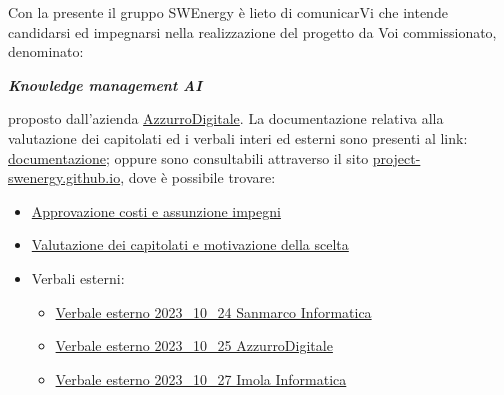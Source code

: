 Con la presente il gruppo SWEnergy è lieto di comunicarVi che intende candidarsi
ed impegnarsi nella realizzazione del progetto da Voi commissionato, denominato:

\begin{center}
\textbf{\textit{Knowledge management AI}}
\end{center}

proposto dall’azienda \href{https://www.azzurrodigitale.com/}{AzzurroDigitale}. 
La documentazione relativa alla valutazione dei capitolati ed i verbali
interi ed esterni sono presenti al link:
\href{https://github.com/Project-SWEnergy/documentazione}{documentazione};
oppure sono consultabili attraverso il sito 
\href{https://project-swenergy.github.io/}{project-swenergy.github.io},
dove è possibile trovare:

\begin{itemize}
	\item
		\href{https://github.com/Project-SWEnergy/documentazione/blob/main/Candidatura/Approvazione\%20costi\%20e\%20assunzione\%20impegni.pdf}{Approvazione costi e assunzione impegni}

	\item
		\href{https://github.com/Project-SWEnergy/documentazione/blob/main/Candidatura/Valutazione\%20capitolati.pdf}{Valutazione dei capitolati e motivazione della scelta}
	
	\item Verbali esterni:
		\begin{itemize}
			\item
				\href{https://github.com/Project-SWEnergy/documentazione/blob/main/Candidatura/Verbale\%20esterno\%20-\%202023_10_24\%20Sanmarco.pdf}{Verbale esterno 2023\_10\_24 Sanmarco Informatica}
			\item
				\href{https://github.com/Project-SWEnergy/documentazione/blob/main/Candidatura/Verbale\%20esterno\%20-\%202023_10_25\%20AzzurroDigitale.pdf}{Verbale esterno 2023\_10\_25 AzzurroDigitale}
			\item
				\href{https://github.com/Project-SWEnergy/documentazione/blob/main/Candidatura/Verbale\%20esterno\%20-\%202023_10_27\%20Imola\%20Informatica.pdf}{Verbale esterno 2023\_10\_27 Imola Informatica}
		\end{itemize}


\end{itemize}
